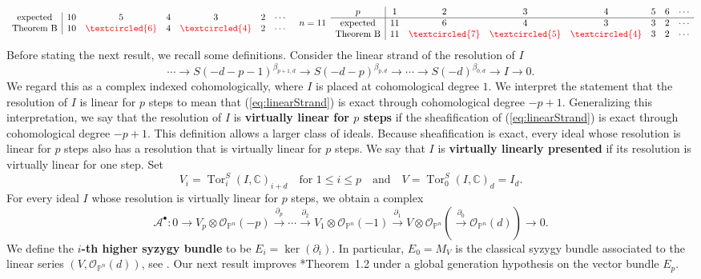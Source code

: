\documentclass[11pt,letterpaper,reqno]{amsart}
\newcommand{\CC}{\mathbb{C}}
\newcommand{\Tor}{\operatorname{Tor}}
\renewcommand{\ker}{\operatorname{ker}}
\newcommand{\mc}[1]{\mathcal{#1}}
\def\PP{{\mathbb P}}
\def\lra{\longrightarrow}
\theoremstyle{definition}
\numberwithin{equation}{section}
\begin{document}
\begin{align*}
\begin{array}{c|cccccccc}
        \text{expected} & 10 & 5 & 4 & 3 & 2 & \cdots\\
        \text{Theorem B} & 10 & {\color{red}\textcircled{6}} & 4 & {\color{red}\textcircled{4}} & 2 & \cdots
    \end{array}
    && n = 11 \,\,\, \begin{array}{c|cccccccc}
        p & 1 & 2 & 3 & 4 & 5 & 6 & \cdots\\\hline
        \text{expected} & 11 & 6 & 4 & 3 & 3  & 2 & \cdots\\
        \text{Theorem B} & 11 & {\color{red}\textcircled{7}} & {\color{red}\textcircled{5}} & {\color{red}\textcircled{4}} & 3 & 2 & \cdots
    \end{array}
\end{align*}
\noindent Before stating the next result, we recall some definitions. Consider the linear strand of the resolution of $I$
\begin{equation}\label{eq:linearStrand}
    \cdots \lra S(-d-p-1)^{\beta_{p+1,d}} \lra S(-d-p)^{\beta_{p,d}} \lra \cdots \lra S(-d)^{\beta_{0,d}} \lra I \lra 0.
\end{equation}
We regard this as a complex indexed cohomologically, where $I$ is placed at cohomological degree $1$. We interpret the statement that the resolution of $I$ is linear for $p$ steps to mean that (\ref{eq:linearStrand}) is exact through cohomological degree $-p + 1$. Generalizing this interpretation, we say that the resolution of $I$ is \textbf{virtually linear for $p$ steps} if the sheafification of (\ref{eq:linearStrand}) is exact through cohomological degree $-p+1$. This definition allows a larger class of ideals. Because sheafification is exact, every ideal whose resolution is linear for $p$ steps also has a resolution that is virtually linear for $p$ steps. We say that $I$ is \textbf{virtually linearly presented} if its resolution is virtually linear for one step. Set
\[V_i = \Tor_i^S(I,\CC)_{i+d} \quad \text{for }1 \le i \le p \quad \text{and} \quad V = \Tor_0^S(I,\CC)_d = I_d.\]
For every ideal $I$ whose resolution is virtually linear for $p$ steps, we obtain a complex
\begin{equation}\label{eq:complexA}
    \mc{A}^\bullet \colon 0 \lra V_p\otimes \mc{O}_{\PP^n}(-p) \overset{\partial_p}{\lra} \cdots \overset{\partial_2}{\lra}  V_1 \otimes \mc{O}_{\PP^n}(-1) \overset{\partial_1}{\lra} V \otimes \mc{O}_{\PP^n}(\overset{\partial_0}{\lra} \mc{O}_{\PP^n}(d)) \lra 0. 
\end{equation}
We define the \textbf{$i$-th higher syzygy bundle} to be $E_i = \ker(\partial_i)$. In particular, $E_0 = M_V$ is the classical syzygy bundle associated to the linear series $(V,\mc{O}_{\PP^n}(d))$, see \cite{L}. Our next result improves \cite{yang}*{Theorem~1.2} under a global generation hypothesis on the vector bundle $E_p$.
\end{document}
